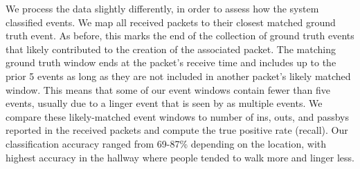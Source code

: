 We process the data slightly differently, in order to assess how the system classified events.
We map all received packets to their closest matched ground truth event.
As before, this marks the end of the collection of ground truth events that likely contributed to the creation of the associated packet.
The matching ground truth window ends at the packet's receive time and includes up to the prior 5 events as long as they are not included in another packet's likely matched window. 
This means that some of our event windows contain fewer than five events, usually due to a linger event that is seen by \sysname as multiple events. 
We compare these likely-matched event windows to number of ins, outs, and passbys reported in the received packets and compute the true positive rate (recall).
Our classification accuracy ranged from 69-87\% depending on the location, with highest accuracy in the hallway where people tended to walk more and linger less.  









